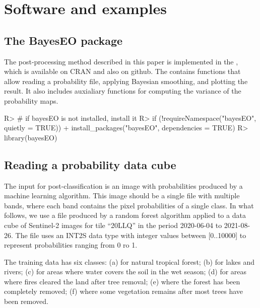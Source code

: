 \documentclass[
  shortnames]{jss}
\begin{document}
\section{Software and examples}\label{software-and-examples}

\subsection{The BayesEO package}\label{the-bayeseo-package}

The post-processing method described in this paper is implemented in the  , which is available on CRAN and also on github. The  contains functions that allow reading a probability file, applying Bayesian smoothing, and plotting the result. It also includes auxialiary functions for computing the variance of the probability maps.

\begin{CodeChunk}
\begin{CodeInput}
R> # if bayesEO is not installed, install it
R> if (!requireNamespace("bayesEO", quietly = TRUE))
+           install_packages("bayesEO", dependencies = TRUE)
R> library(bayesEO)
\end{CodeInput}
\end{CodeChunk}

\subsection{Reading a probability data cube}\label{reading-a-probability-data-cube}

The input for post-classification is an image with probabilities produced by a machine learning algorithm. This image should be a single file with multiple bands, where each band contains the pixel probabilities of a single class. In what follows, we use a file produced by a random forest algorithm applied to a data cube of Sentinel-2 images for tile ``20LLQ'' in the period 2020-06-04 to 2021-08-26. The file uses an INT2S data type with integer values between {[}0..10000{]} to represent probabilities ranging from 0 ro 1.

The training data has six classes: (a)  for natural tropical forest; (b)  for lakes and rivers; (c)  for areas where water covers the soil in the wet season; (d)  for areas where fires cleared the land after tree removal; (e)  where the forest has been completely removed; (f)  where some vegetation remains after most trees have been removed.
\end{document}
